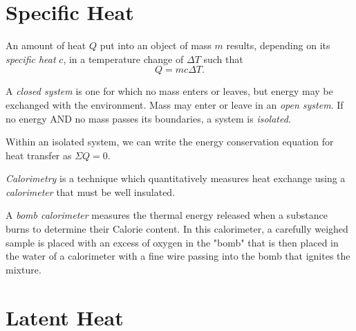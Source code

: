 \section{Specific Heat}

\begin{definition}
    An amount of heat $Q$ put into an object of mass $m$ results, depending on its \emph{specific heat} $c$, in a temperature change of $\Delta T$ such that $$Q = mc\Delta T.$$
\end{definition}
\begin{definition}
    A \emph{closed system} is one for which no mass enters or leaves, but energy may be exchanged with the environment. Mass may enter or leave in an \emph{open system}. If no energy AND no mass passes its boundaries, a system is \emph{isolated}.
\end{definition}
\begin{remark}
    Within an isolated system, we can write the energy conservation equation for heat transfer as $\Sigma Q = 0$.
\end{remark}
\begin{definition}[Calorimetry]
    \emph{Calorimetry} is a technique which quantitatively measures heat exchange using a \emph{calorimeter} that must be well insulated.
\end{definition}
\begin{definition}
    A \emph{bomb calorimeter} measures the thermal energy released when a substance burns to determine their Calorie content. In this calorimeter, a carefully weighed sample is placed with an excess of oxygen in the "bomb" that is then placed in the water of a calorimeter with a fine wire passing into the bomb that ignites the mixture.
\end{definition}

\section{Latent Heat}

